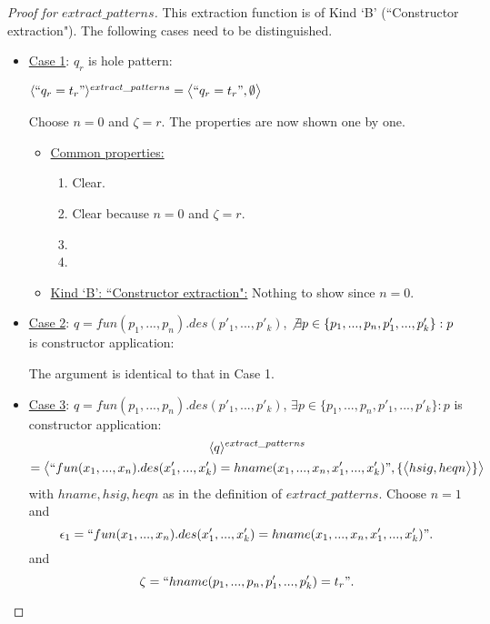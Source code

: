 \documentclass[11pt]{article} %
\begin{document}
\begin{proof}[Proof for $extract\_patterns$] This extraction function is of Kind `B' (``Constructor extraction"). The following cases need to be distinguished.

\begin{itemize}

\item \underline{Case 1}: $q_r$ is hole pattern:

$\langle `` q_r = t_r " \rangle^{extract\_patterns} = \big\langle `` q_r = t_r ", \emptyset \big\rangle$

Choose $n = 0$ and $\zeta = r$. The properties are now shown one by one.

\begin{itemize}
\item \underline{Common properties:}
\begin{enumerate}
\item Clear.
\item Clear because $n = 0$ and $\zeta = r$.
\item
\item 
\end{enumerate}

\item \underline{Kind `B': ``Constructor extraction":} Nothing to show since $n = 0$.

\end{itemize}

\item \underline{Case 2}: $q = fun(p_1, ..., p_n).des(p'_1, ..., p'_k)$, $\not\exists p \in \{ p_1, ..., p_n, p'_1, ..., p'_k \}: p$ is constructor application:

The argument is identical to that in Case 1.

\item \underline{Case 3}: $q = fun(p_1, ..., p_n).des(p'_1, ..., p'_k)$, $\exists p \in \{ p_1, ..., p_n, p'_1, ..., p'_k \}: p$ is constructor application:
\begin{multline*}
\langle q \rangle^{extract\_patterns}\\
= \big\langle `` fun(x_1, ..., x_n).des(x'_1, ..., x'_k) = hname(x_1, ..., x_n, x'_1, ..., x'_k) ", \{ \big\langle hsig, heqn \big\rangle \} \big\rangle
\end{multline*}
with $hname, hsig, heqn$ as in the definition of $extract\_patterns$. Choose $n = 1$ and
\begin{equation*}
\epsilon_1 = `` fun(x_1, ..., x_n).des(x'_1, ..., x'_k) = hname(x_1, ..., x_n, x'_1, ..., x'_k) ".
\end{equation*}
and
\begin{equation*}
\zeta = `` hname(p_1, ..., p_n, p'_1, ..., p'_k) = t_r ".
\end{equation*}


\end{itemize}
\end{proof}
\end{document}
